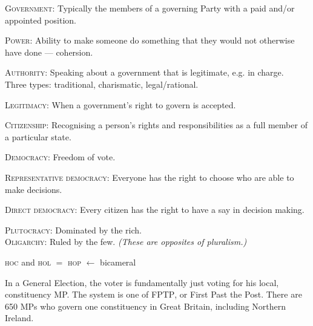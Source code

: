 \documentclass[a4paper,12pt]{article}
\begin{document}
\textsc{Government}: Typically the members of a governing Party with a paid and/or appointed position.

\textsc{Power}: Ability to make someone do something that they would not otherwise have done --- cohersion.

\textsc{Authority}: Speaking about a government that is legitimate, e.g. in charge.\\ Three types: traditional, charismatic, legal/rational.

\textsc{Legitimacy}: When a government's right to govern is accepted.

\textsc{Citizenship}: Recognising a person's rights and responsibilities as a full member of a particular state.

\textsc{Democracy}: Freedom of vote.

\textsc{Representative democracy}: Everyone has the right to choose who are able to make decisions.

\textsc{Direct democracy}: Every citizen has the right to have a say in decision making.

\textsc{Plutocracy}: Dominated by the rich.\\
\textsc{Oligarchy}: Ruled by the few.
\textsl{(These are opposites of pluralism.)}

\textsc{hoc} and \textsc{hol} $=$ \textsc{hop} $\leftarrow$ bicameral

In a General Election, the voter is fundamentally just voting for his local, constituency MP.  The system is one of \textsc{FPTP}, or First Past the Post.  There are 650 MPs who govern one constituency in Great Britain, including Northern Ireland.
\end{document}
